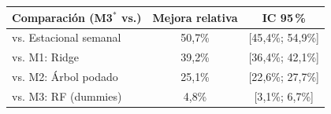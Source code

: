 \begin{tabular}{lcc}
\toprule
Comparación (M3$^\ast$ vs.) & Mejora relativa & IC 95\,\% \\
\midrule
vs. Estacional semanal & 50{,}7\% & [45{,}4\%; 54{,}9\%] \\
vs. M1: Ridge & 39{,}2\% & [36{,}4\%; 42{,}1\%] \\
vs. M2: Árbol podado & 25{,}1\% & [22{,}6\%; 27{,}7\%] \\
vs. M3: RF (dummies) & 4{,}8\% & [3{,}1\%; 6{,}7\%] \\
\bottomrule
\end{tabular}